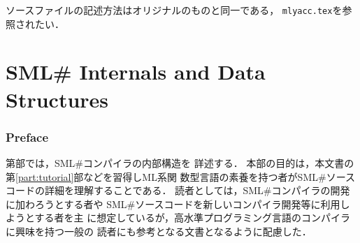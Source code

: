 \documentclass{jbook}
\newcommand{\txt}[2]{#2}
\newcommand{\smlsharp}{SML\#}
\newcommand{\code}[1]{\mbox{\large\tt #1}}
\begin{document}
	ソースファイルの記述方法はオリジナルのものと同一である，
\code{mlyacc.tex}を参照されたい．
\else%
\fi%

%
%	
%

% 
\ifjp%
\else%
\fi%

\ifinternal
\part{\txt{\smlsharp{}の内部構造}{\smlsharp{} Internals and Data Structures}}
\label{part:internals}


\section*{\txt{はじめに}{Preface}}
\ifjp%
	第\ref{part:internals}部では，\smlsharp{}コンパイラの内部構造を
詳述する．
	本部の目的は，本文書の第\ref{part:tutorial}部などを習得しML系関
数型言語の素養を持つ者が\smlsharp{}ソースコードの詳細を理解することである．
	読者としては，\smlsharp{}コンパイラの開発に加わろうとする者や
\smlsharp{}ソースコードを新しいコンパイラ開発等に利用しようとする者を主
に想定しているが，高水準プログラミング言語のコンパイラに興味を持つ一般の
読者にも参考となる文書となるように配慮した．
\end{document}
